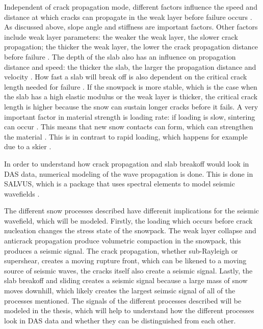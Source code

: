 Independent of crack propagation mode, different factors influence the speed and distance at which cracks can propagate in the weak layer before failure occurs \parencite{gaumeDynamicAnticrackPropagation2018,gaumeSnowFractureRelation2017a,gaumeModelingCrackPropagation2015}. As discussed above, slope angle and stiffness are important factors. Other factors include weak layer parameters: the weaker the weak layer, the slower crack propagation; the thicker the weak layer, the lower the crack propagation distance before failure \parencite{gaumeModelingCrackPropagation2015}. The depth of the slab also has an influence on propagation distance and speed: the thicker the slab, the larger the propagation distance and velocity \parencite{gaumeModelingCrackPropagation2015}. How fast a slab will break off is also dependent on the critical crack length needed for failure \parencite{gaumeSnowFractureRelation2017a}. If the snowpack is more stable, which is the case when the slab has a high elastic modulus or the weak layer is thicker, the critical crack length is higher \parencite{gaumeSnowFractureRelation2017a} because the snow can sustain longer cracks before it fails. A very important factor in material strength is loading rate: if loading is slow, sintering can occur \parencite{mulakNumericalInvestigationMixedmode2019}. This means that new snow contacts can form, which can strengthen the material \parencite{mulakNumericalInvestigationMixedmode2019}. This is in contrast to rapid loading, which happens for example due to a skier \parencite{mulakNumericalInvestigationMixedmode2019}. 


In order to understand how crack propagation and slab breakoff would look in DAS data, numerical modeling of the wave propagation is done. This is done in SALVUS, which is a package that uses spectral elements to model seismic wavefields \parencite{afanasievSalvusFlexibleHighperformance2017}. \par

The different snow processes described have differenit implications for the seismic wavefield, which will be modeled. Firstly, the loading which occurs before crack nucleation changes the stress state of the snowpack. The weak layer collapse and anticrack propagation produce volumetric compaction in the snowpack, this produces a seismic signal. The crack propagation, whether sub-Rayleigh or supershear, creates a moving rupture front, which can be likened to a moving source of seismic waves, the cracks itself also create a seismic signal. Lastly, the slab breakoff and sliding creates a seismic signal because a large mass of snow moves downhill, which likely creates the largest seimsic signal of all of the processes mentioned. The signals of the different processes described will be modeled in the thesis, which will help to understand how the different processes look in DAS data and whether they can be distinguished from each other. \par

